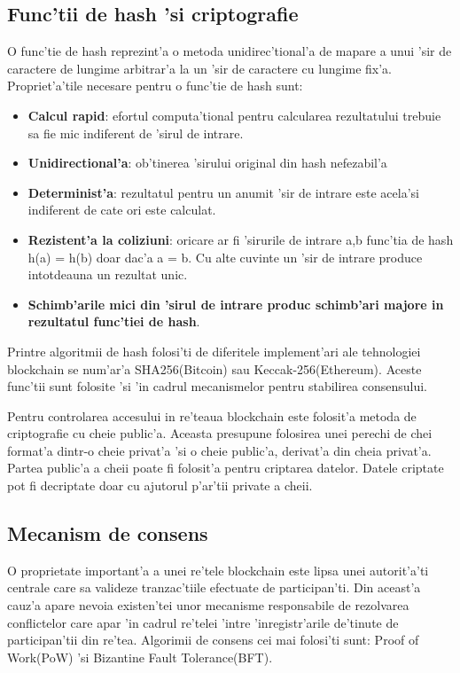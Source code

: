 \documentclass[12pt,a4paper,twoside]{report}
\begin{document}
\subsection{Func'tii de hash 'si criptografie}
	O func'tie de hash reprezint'a o metoda unidirec'tional'a de mapare a unui 'sir de caractere de lungime arbitrar'a la un 'sir de caractere cu lungime fix'a. Propriet'a'tile necesare pentru o func'tie de hash sunt:
	\begin{itemize}
		\item \textbf{Calcul rapid}: efortul computa'tional pentru calcularea rezultatului trebuie sa fie mic indiferent de 'sirul de intrare.
		\item \textbf{Unidirectional'a}: ob'tinerea 'sirului original din hash nefezabil'a
		\item \textbf{Determinist'a}: rezultatul pentru un anumit 'sir de intrare este acela'si indiferent de cate ori este calculat. 
		\item \textbf{Rezistent'a la coliziuni}: oricare ar fi 'sirurile de intrare a,b func'tia de hash h(a) = h(b) doar dac'a a = b. Cu alte cuvinte un 'sir de intrare produce intotdeauna un rezultat unic.
		\item \textbf{Schimb'arile mici din 'sirul de intrare produc schimb'ari majore in rezultatul func'tiei de hash}.
\end{itemize}		
	 Printre algoritmii de hash folosi'ti de diferitele implement'ari ale tehnologiei blockchain se num'ar'a SHA256(Bitcoin)\cite{bitcoin} sau Keccak-256(Ethereum)\cite{eth-yellow}. Aceste func'tii sunt folosite 'si 'in cadrul mecanismelor  pentru stabilirea consensului.
	 
	 
		Pentru controlarea accesului in re'teaua blockchain este folosit'a metoda de criptografie cu cheie public'a. Aceasta presupune folosirea unei perechi de chei format'a dintr-o cheie privat'a 'si o cheie public'a, derivat'a din cheia privat'a. Partea public'a a cheii poate fi folosit'a pentru criptarea datelor. Datele criptate pot fi decriptate doar cu ajutorul p'ar'tii private a cheii\cite{crypto}. 
		\subsection{Mecanism de consens}
		O proprietate important'a a unei re'tele blockchain este lipsa unei autorit'a'ti centrale care sa valideze tranzac'tiile efectuate de participan'ti. Din aceast'a cauz'a apare nevoia existen'tei unor mecanisme responsabile de rezolvarea conflictelor care apar 'in cadrul re'telei 'intre 'inregistr'arile de'tinute de participan'tii din re'tea. Algorimii de consens cei mai folosi'ti sunt: Proof of Work(PoW) 'si Bizantine Fault Tolerance(BFT).
	
\end{document}
